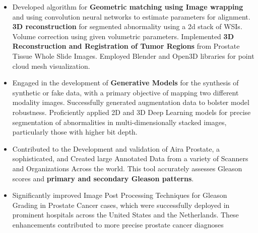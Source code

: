 \documentclass[a4paper,10pt]{extarticle}
\begin{document}
{\begin{itemize}
    \vspace{1.2mm}\item Developed algorithm for \textbf{Geometric matching using Image wrapping} and using convolution neural networks to estimate parameters for alignment. \textbf{3D reconstruction} for segmented abnormality using a 2d stack of WSIs. Volume correction using given volumetric parameters. Implemented \textbf{3D Reconstruction and Registration of Tumor Regions} from Prostate Tissue Whole Slide Images. Employed Blender and Open3D libraries for point cloud mesh visualization. 
    
     \vspace{1.2mm}\item Engaged in the development of \textbf{Generative Models} for the synthesis of synthetic or fake data, with a primary objective of mapping two different modality images. Successfully generated augmentation data to bolster model robustness. Proficiently applied 2D and 3D Deep Learning models for precise segmentation of abnormalities in multi-dimensionally stacked images, particularly those with higher bit depth.
     \vspace{1.2mm}\item Contributed to the Development and validation of Aira Prostate, a sophisticated, and Created large Annotated Data from a variety of Scanners and Organizations Across the world. This tool accurately assesses Gleason scores and \textbf{primary and secondary Gleason patterns}.
     \vspace{1.2mm}\item Significantly improved Image Post Processing Techniques for Gleason Grading in Prostate Cancer cases, which were successfully deployed in prominent hospitals across the United States and the Netherlands. These enhancements contributed to more precise prostate cancer diagnoses

\end{itemize}

}
\end{document}
